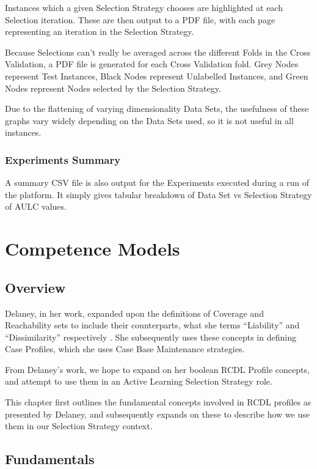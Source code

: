 \documentclass[a4paper,11pt]{report}
\begin{document}
Instances which a given Selection Strategy chooses are highlighted at each Selection iteration. These are then output to a PDF file, with each page representing an iteration in the Selection Strategy.

Because Selections can't really be averaged across the different Folds in the Cross Validation, a PDF file is generated for each Cross Validation fold. Grey Nodes represent Test Instances, Black Nodes represent Unlabelled Instances, and Green Nodes represent Nodes selected by the Selection Strategy.

Due to the flattening of varying dimensionality Data Sets, the usefulness of these graphs vary widely depending on the Data Sets used, so it is not useful in all instances.

\subsection{Experiments Summary}
A summary CSV file is also output for the Experiments executed during a run of the platform. It simply gives tabular breakdown of Data Set vs Selection Strategy of AULC values.

\chapter{Competence Models\label{cha:CompetenceModels}}
\section{Overview}

Delaney, in her work, expanded upon the definitions of Coverage and Reachability sets to include their counterparts, what she terms ``Liability'' and ``Dissimilarity'' respectively \cite{Delany2009}. She subsequently uses these concepts in defining Case Profiles, which she uses Case Base Maintenance strategies.

From Delaney's work, we hope to expand on her boolean RCDL Profile concepts, and attempt to use them in an Active Learning Selection Strategy role.

This chapter first outlines the fundamental concepts involved in RCDL profiles as presented by Delaney, and subsequently expands on these to describe how we use them in our Selection Strategy context.

\section{Fundamentals}
\end{document}
